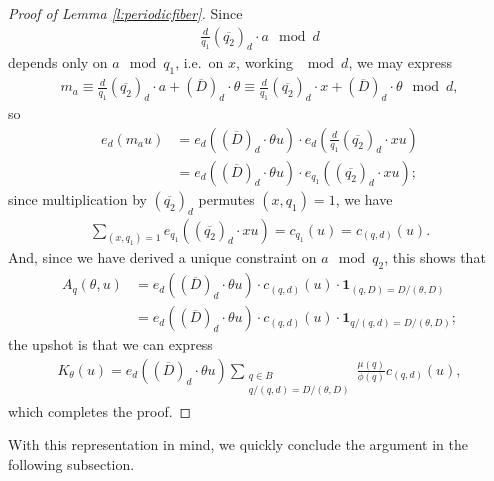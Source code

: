 \documentclass[12pt]{amsart}
\numberwithin{equation}{section}
\theoremstyle{definition}
\begin{document}
\begin{proof}[Proof of Lemma \ref{l:periodicfiber}]
Since
\begin{align}
     \frac{d}{q_1} (\overline{q_2})_d \cdot a \mod d
\end{align}
depends only on $a \mod q_1$, i.e.\ on $x$, working $\mod d$, we may express
\begin{align}
    m_a \equiv \frac{d}{q_1} (\overline{q_2})_d \cdot a + (\overline{D})_d \cdot \theta \equiv \frac{d}{q_1} (\overline{q_2})_d \cdot x + (\overline{D})_d  \cdot \theta \mod d,
\end{align}
so
\begin{align}
    e_d(m_a u) &= e_d((\overline{D})_d  \cdot \theta u)\cdot  e_d(\frac{d}{q_1} (\overline{q_2})_d  \cdot  x u) \\
    & = e_d((\overline{D})_d  \cdot\theta u) \cdot e_{q_1}((\overline{q_2})_d  \cdot x u);
\end{align}
since multiplication by $(\overline{q_2})_d$ permutes $(x,q_1) = 1$, we have
\begin{align}
    \sum_{(x,q_1) =1} e_{q_1}((\overline{q_2})_d  \cdot x u) = c_{q_1}(u) = c_{(q,d)}(u).
\end{align}
And, since we have derived a unique constraint on $a \mod q_2$, this shows that \begin{align}
    A_q(\theta,u) &= e_d((\overline{D})_d  \cdot \theta u) \cdot c_{(q,d)}(u)\cdot  \mathbf{1}_{(q,D)= D/(\theta,D)} \\
    &= e_d((\overline{D})_d  \cdot\theta u) \cdot  c_{(q,d)}(u) \cdot \mathbf{1}_{q/(q,d) = D/(\theta,D)};
\end{align}
the upshot is that we can express
    \begin{align}
        K_\theta(u) = e_d((\overline{D})_d  \cdot \theta u) \sum_{\substack{q \in B \\ q/(q,d) = D/(\theta,D)}} \frac{\mu(q)}{\phi(q)} c_{(q,d)}(u),
    \end{align}
which completes the proof.
\end{proof}

With this representation in mind, we quickly conclude the argument in the following subsection.
\end{document}
